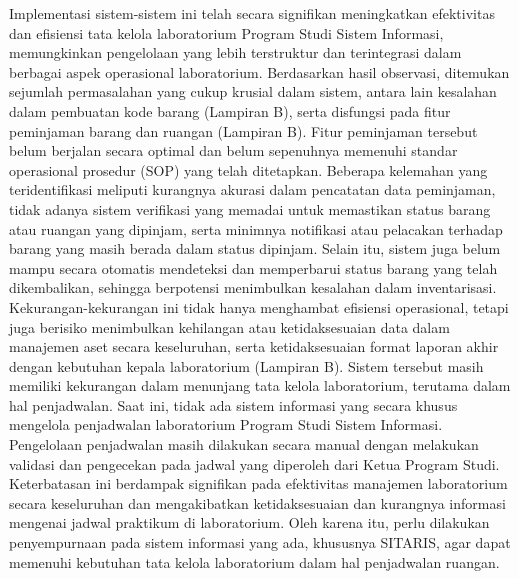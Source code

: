 Implementasi sistem-sistem ini telah secara signifikan meningkatkan efektivitas dan efisiensi tata kelola laboratorium Program Studi Sistem Informasi, memungkinkan pengelolaan yang lebih terstruktur dan terintegrasi dalam berbagai aspek operasional laboratorium. Berdasarkan hasil observasi, ditemukan sejumlah permasalahan yang cukup krusial dalam sistem, antara lain kesalahan dalam pembuatan kode barang (Lampiran B), serta disfungsi pada fitur peminjaman barang dan ruangan (Lampiran B). Fitur peminjaman tersebut belum berjalan secara optimal dan belum sepenuhnya memenuhi standar operasional prosedur (SOP) yang telah ditetapkan. Beberapa kelemahan yang teridentifikasi meliputi kurangnya akurasi dalam pencatatan data peminjaman, tidak adanya sistem verifikasi yang memadai untuk memastikan status barang atau ruangan yang dipinjam, serta minimnya notifikasi atau pelacakan terhadap barang yang masih berada dalam status dipinjam. Selain itu, sistem juga belum mampu secara otomatis mendeteksi dan memperbarui status barang yang telah dikembalikan, sehingga berpotensi menimbulkan kesalahan dalam inventarisasi. Kekurangan-kekurangan ini tidak hanya menghambat efisiensi operasional, tetapi juga berisiko menimbulkan kehilangan atau ketidaksesuaian data dalam manajemen aset secara keseluruhan, serta ketidaksesuaian format laporan akhir dengan kebutuhan kepala laboratorium (Lampiran B). Sistem tersebut masih memiliki kekurangan dalam menunjang tata kelola laboratorium, terutama dalam hal penjadwalan. Saat ini, tidak ada sistem informasi yang secara khusus mengelola penjadwalan laboratorium Program Studi Sistem Informasi. Pengelolaan penjadwalan masih dilakukan secara manual dengan melakukan validasi dan pengecekan pada jadwal yang diperoleh dari Ketua Program Studi. Keterbatasan ini berdampak signifikan pada efektivitas manajemen laboratorium secara keseluruhan dan mengakibatkan ketidaksesuaian dan kurangnya informasi mengenai jadwal praktikum di laboratorium. Oleh karena itu, perlu dilakukan penyempurnaan pada sistem informasi yang ada, khususnya SITARIS, agar dapat memenuhi kebutuhan tata kelola laboratorium dalam hal penjadwalan ruangan.

